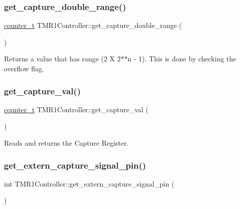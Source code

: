 \subsubsection{\texorpdfstring{get\+\_\+capture\+\_\+double\+\_\+range()}{get\_capture\_double\_range()}}
{\footnotesize\ttfamily \hyperlink{types_8hpp_ac89ac912f524b3e3fa3720ea55fec966}{counter\+\_\+t} T\+M\+R1\+Controller\+::get\+\_\+capture\+\_\+double\+\_\+range (\begin{DoxyParamCaption}{ }\end{DoxyParamCaption})}



Returns a value that has range (2 X 2$\ast$$\ast$n -\/ 1). This is done by checking the overflow flag. 

\mbox{\label{classTMR1Controller_a3d07eed72365e7a7b44fadefb23b9ba6}} 
\subsubsection{\texorpdfstring{get\+\_\+capture\+\_\+val()}{get\_capture\_val()}}
{\footnotesize\ttfamily \hyperlink{types_8hpp_ac89ac912f524b3e3fa3720ea55fec966}{counter\+\_\+t} T\+M\+R1\+Controller\+::get\+\_\+capture\+\_\+val (\begin{DoxyParamCaption}{ }\end{DoxyParamCaption})\hspace{0.3cm}{\ttfamily [inline]}}



Reads and returns the Capture Register. 

\mbox{\label{classTMR1Controller_a49a1a48db1600173eeb24858645a0366}} 
\subsubsection{\texorpdfstring{get\+\_\+extern\+\_\+capture\+\_\+signal\+\_\+pin()}{get\_extern\_capture\_signal\_pin()}}
{\footnotesize\ttfamily int T\+M\+R1\+Controller\+::get\+\_\+extern\+\_\+capture\+\_\+signal\+\_\+pin (\begin{DoxyParamCaption}{ }\end{DoxyParamCaption})\hspace{0.3cm}{\ttfamily [inline]}}



